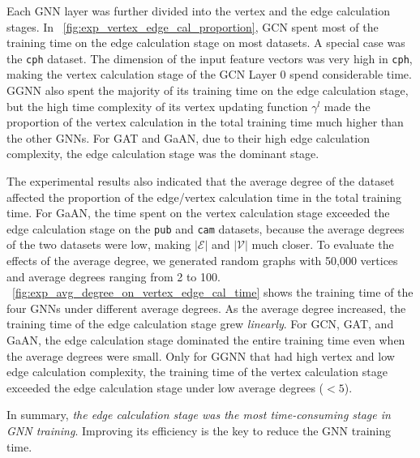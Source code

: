 Each GNN layer was further divided into the vertex and the edge calculation stages.
%
In \figurename~\ref{fig:exp_vertex_edge_cal_proportion}, GCN spent most of the training time on the edge calculation stage on most datasets.
%
A special case was the \texttt{cph} dataset.
%
The dimension of the input feature vectors was very high in \texttt{cph}, making the vertex calculation stage of the GCN Layer 0 spend considerable time.
%
GGNN also spent the majority of its training time on the edge calculation stage, but the high time complexity of its vertex updating function $\gamma^l$ made the proportion of the vertex calculation in the total training time much higher than the other GNNs.
%
For GAT and GaAN, due to their high edge calculation complexity, the edge calculation stage was the dominant stage.

The experimental results also indicated that the average degree of the dataset affected the proportion of the edge/vertex calculation time in the total training time.
%
For GaAN, the time spent on the vertex calculation stage exceeded the edge calculation stage on the \texttt{pub} and \texttt{cam} datasets, because the average degrees of the two datasets were low, making $|\mathcal{E}|$ and $|\mathcal{V}|$ much closer.
%
To evaluate the effects of the average degree, we generated random graphs with 50,000 vertices and average degrees ranging from 2 to 100.
%
\figurename~\ref{fig:exp_avg_degree_on_vertex_edge_cal_time} shows the training time of the four GNNs under different average degrees.
%
As the average degree increased, the training time of the edge calculation stage grew \emph{linearly}.
%
For GCN, GAT, and GaAN, the edge calculation stage dominated the entire training time even when the average degrees were small.
%
Only for GGNN that had high vertex and low edge calculation complexity, the training time of the vertex calculation stage exceeded the edge calculation stage under low average degrees ($<5$).

In summary, \emph{the edge calculation stage was the most time-consuming stage in GNN training}.
%
Improving its efficiency is the key to reduce the GNN training time.

